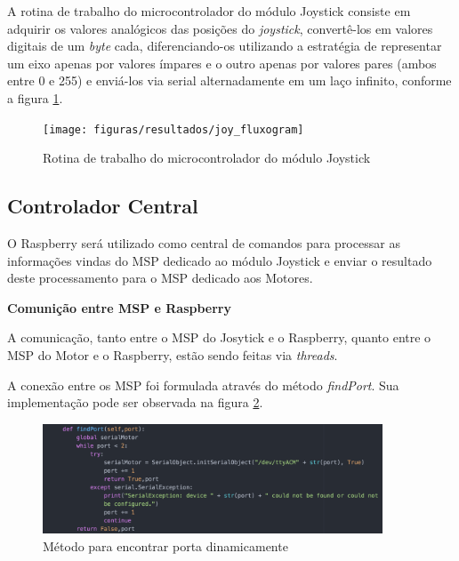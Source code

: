 A rotina de trabalho do microcontrolador do módulo Joystick consiste em adquirir os valores analógicos das posições do \textit{joystick}, convertê-los em valores digitais de um \textit{byte} cada, diferenciando-os utilizando a estratégia de representar um eixo apenas por valores ímpares e o outro apenas por valores pares (ambos entre 0 e 255) e enviá-los via serial alternadamente em um laço infinito, conforme a figura \ref{fig:joy_fluxogram}.

\begin{figure}[!htb]
\centering
\texttt{[image: figuras/resultados/joy\_fluxogram]}
\caption{Rotina de trabalho do microcontrolador do módulo Joystick}
\label{fig:joy_fluxogram}
\end{figure}

\subsection{Controlador Central}

  O Raspberry será utilizado como central de comandos para processar as informações vindas do MSP dedicado ao módulo Joystick e enviar o resultado deste processamento para o MSP dedicado aos Motores.

  \textbf{Comunição entre MSP e Raspberry}

  A comunicação, tanto entre o MSP do Josytick e o Raspberry, quanto entre o MSP do Motor e o Raspberry, estão sendo feitas via \textit{threads}.

  A conexão entre os MSP foi formulada através do método \textit{findPort}. Sua implementação pode ser observada na figura \ref{fig:find_port_method}.

  \begin{figure}[!htb]
    \centering
    \includegraphics[width=0.9\textwidth]{figuras/resultados/find_port_method}
    \caption{Método para encontrar porta dinamicamente}
    \label{fig:find_port_method}
  \end{figure}

